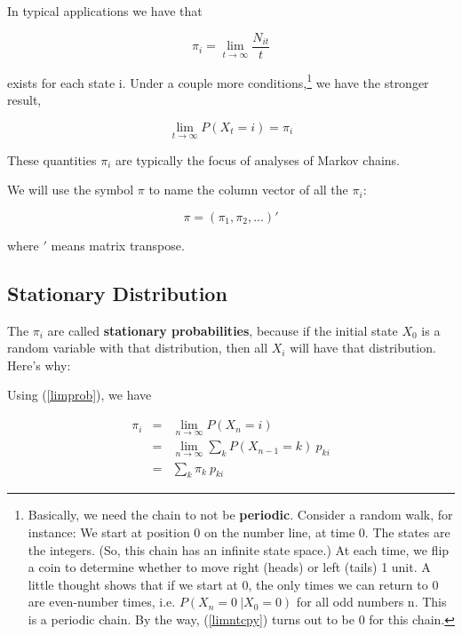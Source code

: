 In typical applications we have that 

\begin{equation} 
\label{limntcpy} 
\pi_{i}=\lim_{t\rightarrow \infty}\frac{N_{it}}{t} 
\end{equation}
                 
exists for each state i.  Under a couple more
conditions,\footnote{Basically, we need the chain to not be {\bf
periodic}.  Consider a random walk, for instance:  We start at position
0 on the number line, at time 0.  The states are the integers.  (So,
this chain has an infinite state space.) At each time, we flip a coin to
determine whether to move right (heads) or left (tails) 1 unit.  A
little thought shows that if we start at 0, the only times we can return
to 0 are even-number times, i.e. $P(X_n = 0 ~| X_0 = 0)$ for all odd
numbers n.  This is a periodic chain.  By the way, (\ref{limntcpy})
turns out to be 0 for this chain.} we have the stronger result,

\begin{equation}
\label{limprob}
\lim_{t\rightarrow \infty }P(X_{t}=i)=\pi_{i}
\end{equation}

These quantities $\pi_i$ are typically the focus of analyses of Markov
chains.

We will use the symbol $\pi$ to name the column vector of all the
$\pi_i$:

\begin{equation}
\pi = (\pi_1, \pi_2, ...)'
\end{equation}

where $'$ means matrix transpose.

\subsection{Stationary Distribution}

The $\pi_i$ are called {\bf stationary probabilities}, because if the
initial state $X_0$ is a random variable with that distribution, then
all $X_i$ will have that distribution.  Here's why:

Using (\ref{limprob}), we have

\begin{eqnarray}
\label{stationeqns}
\pi_i 
&=& \lim_{n \rightarrow \infty} P(X_{n} = i)  \\
&=& \lim_{n \rightarrow \infty} \sum_k P(X_{n-1} = k) ~ p_{ki} \\ 
&=& \sum_k \pi_k ~ p_{ki} \label{lastpieqn} 
\end{eqnarray}

